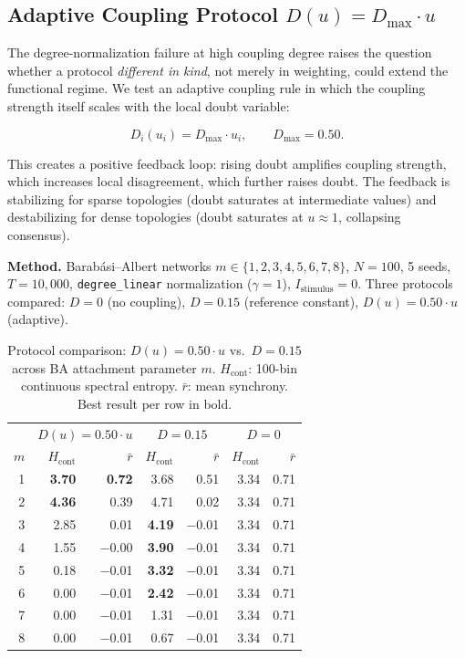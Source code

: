 ﻿\documentclass[11pt]{article}
\begin{document}
\subsection{Adaptive Coupling Protocol $D(u) = D_{\max} \cdot u$}
\label{sec:adaptive_coupling}

The degree-normalization failure at high coupling degree raises the question whether a protocol \emph{different in kind}, not merely in weighting, could extend the functional regime. We test an adaptive coupling rule in which the coupling strength itself scales with the local doubt variable:

\begin{equation}
D_i(u_i) = D_{\max} \cdot u_i, \qquad D_{\max} = 0.50.
\label{eq:adaptive_D}
\end{equation}

This creates a positive feedback loop: rising doubt amplifies coupling strength, which increases local disagreement, which further raises doubt. The feedback is stabilizing for sparse topologies (doubt saturates at intermediate values) and destabilizing for dense topologies (doubt saturates at $u \approx 1$, collapsing consensus).

\textbf{Method.} Barabási--Albert networks $m \in \{1, 2, 3, 4, 5, 6, 7, 8\}$, $N = 100$, 5 seeds, $T = 10{,}000$, \texttt{degree\_linear} normalization ($\gamma = 1$), $I_{\text{stimulus}} = 0$. Three protocols compared: $D = 0$ (no coupling), $D = 0.15$ (reference constant), $D(u) = 0.50 \cdot u$ (adaptive).

\begin{table}[ht]
\centering
\caption{Protocol comparison: $D(u) = 0.50 \cdot u$ vs.\ $D = 0.15$ across BA attachment parameter $m$. $H_{\text{cont}}$: 100-bin continuous spectral entropy. $\bar{r}$: mean synchrony. Best result per row in bold.}
\label{tab:adaptive_D_sweep}
\begin{tabular}{rrrrrrr}
\toprule
 & \multicolumn{2}{c}{$D(u) = 0.50 \cdot u$} & \multicolumn{2}{c}{$D = 0.15$} & \multicolumn{2}{c}{$D = 0$} \\
$m$ & $H_{\text{cont}}$ & $\bar{r}$ & $H_{\text{cont}}$ & $\bar{r}$ & $H_{\text{cont}}$ & $\bar{r}$ \\
\midrule
1 & \textbf{3.70} & \textbf{0.72} & 3.68 & 0.51 & 3.34 & 0.71 \\
2 & \textbf{4.36} & 0.39 & 4.71 & 0.02 & 3.34 & 0.71 \\
3 & 2.85 & 0.01 & \textbf{4.19} & $-$0.01 & 3.34 & 0.71 \\
4 & 1.55 & $-$0.00 & \textbf{3.90} & $-$0.01 & 3.34 & 0.71 \\
5 & 0.18 & $-$0.01 & \textbf{3.32} & $-$0.01 & 3.34 & 0.71 \\
6 & 0.00 & $-$0.01 & \textbf{2.42} & $-$0.01 & 3.34 & 0.71 \\
7 & 0.00 & $-$0.01 & 1.31 & $-$0.01 & 3.34 & 0.71 \\
8 & 0.00 & $-$0.01 & 0.67 & $-$0.01 & 3.34 & 0.71 \\
\bottomrule
\end{tabular}
\end{table}
\end{document}

